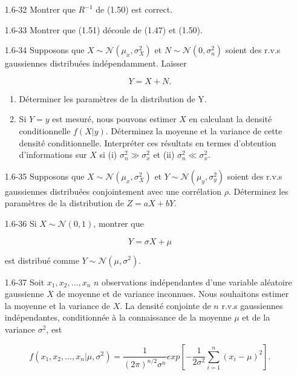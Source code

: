 \documentclass[10pt,twoside,a4paper]{book}
\begin{document}
\begin{enumerate}
  \item[1.6-32] Montrer que $R^{-1}$ de (1.50) est correct.
  \item[1.6-33] Montrer que (1.51) découle de (1.47) et (1.50).
  

  \item[1.6-34] Supposons que $X \sim \mathcal{N}(\mu_x, \sigma_X^2)$ et $N \sim \mathcal{N}(0, \sigma_n^2)$ soient des r.v.s gaussiennes distribuées indépendamment. Laisser
  
  \begin{equation*}
    Y = X + N.
  \end{equation*}

  \begin{enumerate}
    \item Déterminer les paramètres de la distribution de Y.
    \item Si $Y = y$ est mesuré, nous pouvons estimer $X$ en calculant la densité conditionnelle $f(X|y)$. Déterminez la moyenne et la variance de cette densité conditionnelle. Interpréter ces résultats en termes d'obtention d'informations sur $X$ si (i) $\sigma_n^2 \gg \sigma_x^2$ et (ii) $\sigma_n^2 \ll \sigma_x^2$.
  \end{enumerate}

  \item[1.6-35] Supposons que $X \sim \mathcal{N}(\mu_x, \sigma_X^2)$ et $Y \sim \mathcal{N}(\mu_y, \sigma_y^2)$ soient des r.v.s gaussiennes distribuées conjointement avec une corrélation $\rho$. Déterminez les paramètres de la distribution de $Z = aX + bY$.
  \item[1.6-36] Si $X \sim \mathcal{N}(0, 1)$, montrer que
  
  \begin{equation*}
    Y = \sigma X + \mu
  \end{equation*}

  \noindent
  est distribué comme $Y \sim \mathcal{N}(\mu, \sigma^2)$.

  \item[1.6-37] Soit $x_1, x_2, \ldots, x_n$ $n$ observations indépendantes d'une variable aléatoire gaussienne $X$ de moyenne et de variance inconnues. Nous souhaitons estimer la moyenne et la variance de $X$. 
  La densité conjointe de $n$ r.v.s gaussiennes indépendantes, conditionnée à la connaissance de la moyenne $\mu$ et de la variance $\sigma^2$, est

  \begin{equation*}
    f(x_1, x_2, \ldots, x_n | \mu , \sigma^2) = \frac{1}{(2 \pi )^{n/2} \sigma^n} exp \left[- \frac{1}{2\sigma^2} \sum_{i=1}^{n} (x_i - \mu)^2 \right].
  \end{equation*}


\end{enumerate}
\end{document}
